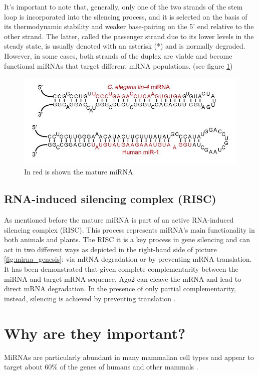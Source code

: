 It's important to note that, generally, only one of the two strands of the stem loop is incorporated into the silencing process, and it is selected on the basis of its thermodynamic stability and weaker base-pairing on the 5' end relative to the other strand. The latter, called the passenger strand due to its lower levels in the steady state, is usually denoted with an asterisk (*) and is normally degraded. However, in some cases, both strands of the duplex are viable and become functional miRNAs that target different mRNA populations. (see figure \ref{fig:mirna_stems})

\begin{figure}[hbt!]
	\centering
	\includegraphics[width=1.0\textwidth]{Figures/mirna_stems}
	\caption{ In red is shown the mature miRNA.}
	\label{fig:mirna_stems}
\end{figure}

\subsection{RNA-induced silencing complex (RISC)}
As mentioned before the mature miRNA is part of an active RNA-induced silencing complex (RISC). This process represents miRNA's main functionality in both animals and plants. 
The RISC it is a key process in gene silencing and can act in two different ways as depicted in the right-hand side of picture \ref{fig:mirna_genesis}: via mRNA degradation or by preventing mRNA translation. It has been demonstrated that given complete complementarity between the miRNA and target mRNA sequence, Ago2 can cleave the mRNA and lead to direct mRNA degradation. In the presence of only partial complementarity, instead, silencing is achieved by preventing translation \cite{cleavage}.
 

\section{Why are they important?}
MiRNAs are particularly abundant in many mammalian cell types and appear to target about 60\% of the genes of humans and other mammals \cite{conserved_pairing}.

